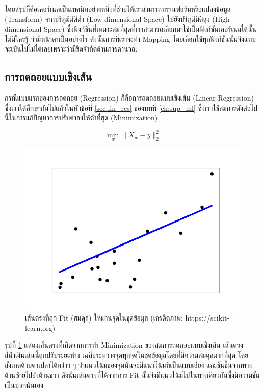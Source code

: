 โดยสรุปก็คือเคอร์เนลเป็นเทคนิคอย่างหนึ่งที่ช่วยให้เราสามารถทรานฟอร์มหรือแปลงข้อมูล (Transform) จากปริภูมิมิติต่ำ (Low-dimensional 
Space) ไปยังปริภูมิมิติสูง (High-dimensional Space) ซึ่งฟังก์ชันที่เหมาะสมที่สุดที่เราสามารถเลือกมาใช้เป็นฟังก์ชันเคอร์เนลได้นั้นไม่มีใครรู้%
ว่ามีหน้าตาเป็นอย่างไร ดังนั้นการที่เราจะทำ Mapping โดยเลือกใช้ทุกฟังก์ชันนั้นจึงแทบจะเป็นไปไม่ได้เลยเพราะว่ามีขีดจำกัดด้านการคำนวณ

\subsection{การถดถอยแบบเชิงเส้น}
\label{ssec:lin_reg}

กรณีแบบแรกของการถดถอย (Regression) ก็คือการถดถอยแบบเชิงเส้น (Linear Regression) ซึ่งเราได้ศึกษากันไปแล้วในหัวข้อที่ 
\ref{sec:lin_res} ของบทที่ \ref{ch:sup_ml} ซึ่งเราใช้สมการดังต่อไปนี้ในการแก้ปัญหาการปรับค่าลงให้ต่ำที่สุด (Minimization)

\begin{equation}
    \min_{w} \lVert X_{w} - y \rVert_{2}^{2}
\end{equation}

\begin{figure}[htbp]
    \centering
    \includegraphics[width=0.8\linewidth]{fig/plot_linear_regression.png}
    \caption{เส้นตรงที่ถูก Fit (สมดุล) ให้ผ่านจุดในชุดข้อมูล (เครดิตภาพ: https://scikit-learn.org)}
    \label{fig:lin_res}
\end{figure}

รูปที่ \ref{fig:lin_res} แสดงเส้นตรงที่เกิดจากการทำ Minimization ของสมการถดถอยแบบเชิงเส้น เส้นตรงสีน้ำเงินเส้นนี้ถูกปรับระยะห่าง%
เฉลี่ยระหว่างจุดทุกจุดในชุดข้อมูลโดยที่มีความสมดุลมากที่สุด โดยสังเกตด้วยตาเปล่าได้คร่าว ๆ ว่าแนวโน้มของจุดนั้นจะมีแนวโน้มที่เป็นแบบเอียง%
และชันขึ้นจากทางด้านซ้ายไปยังด้านขวา ดังนั้นเส้นตรงที่ได้จากการ Fit นั้นจึงมีแนวโน้มไปในทางเดียวกันซึ่งมีความชันเป็นบวกนั่นเอง

